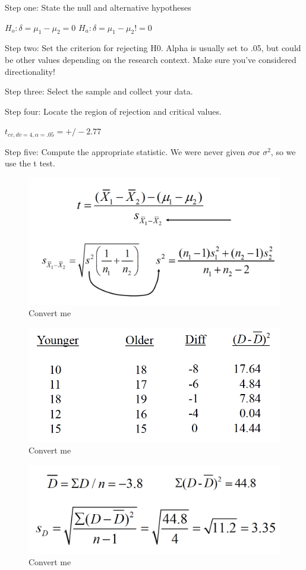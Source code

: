 \documentclass[]{book}
\theoremstyle{definition}
\theoremstyle{definition}
\theoremstyle{definition}
\theoremstyle{remark}
\begin{document}
{Step one: State the null and alternative hypotheses

\(H_o : \delta = \mu_1 - \mu_2 = 0\)
\(H_a : \delta = \mu_1 - \mu_2 != 0\)

Step two: Set the criterion for rejecting H0. Alpha is usually set to
.05, but could be other values depending on the research context. Make
sure you've considered directionality!

Step three: Select the sample and collect your data.

Step four: Locate the region of rejection and critical values.

\(t_{cv,dv=4, \alpha=.05}= +/- 2.77\)

Step five: Compute the appropriate statistic. We were never given
\(\sigma\)or \(\sigma^2\), so we use the t test.

\begin{figure}
\centering
\includegraphics{img/hickssampling14.png}
\caption{Convert me}
\end{figure}

\begin{figure}
\centering
\includegraphics{img/hickssampling21.png}
\caption{Convert me}
\end{figure}

\begin{figure}
\centering
\includegraphics{img/hickssampling22.png}
\caption{Convert me}
\end{figure}

}
\end{document}
